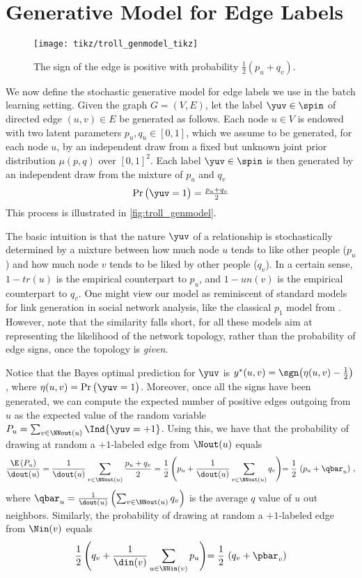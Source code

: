 \section{Generative Model for Edge Labels}\label{s:gen}

\begin{wrapfigure}[8]{o}[10mm]{50mm}
	\centering
	\texttt{[image: tikz/troll\_genmodel\_tikz]}
	\caption{\small The sign \yuv{} of the edge \euv{} is positive with probability $\frac{1}{2}(p_u+q_v)$.
	\label{fig:troll_genmodel}}
\end{wrapfigure}
We now define the stochastic generative model for edge labels we use in the batch learning setting.
Given the graph $G = (V,E)$, let the label $\yuv \in \spin$ of directed edge $(u,v) \in E$ be
generated as follows. Each node $u \in V$ is endowed with two latent parameters $p_u, q_u \in
[0,1]$, which we assume to be generated, for each node $u$, by an independent draw from a fixed but
unknown joint prior distribution $\mu(p,q)$ over $[0,1]^2$. Each label $\yuv \in \spin$ is then
generated by an independent draw from the mixture of $p_u$ and $q_v$
$$\Pr\big( \yuv = 1 \big) = \tfrac{p_u + q_v}{2}$$
This process is illustrated in \autoref{fig:troll_genmodel}.

The basic intuition is that the nature $\yuv$ of a relationship \euv{} is stochastically
determined by a mixture between how much node $u$ tends to like other people ($p_u$) and how much
node $v$ tends to be liked by other people ($q_v$). In a certain sense, $1-tr(u)$ is the empirical
counterpart to $p_u$, and $1-un(v)$ is the empirical counterpart to $q_v$. One might view
our model as reminiscent of standard models for link generation in social network analysis, like the
classical $p_1$ model from \cite{hl81}. However, note that the similarity falls short, for all these
models aim at
representing the likelihood of the network topology, rather than the probability of edge signs, once
the topology is \emph{given}.

Notice that the Bayes optimal prediction for $\yuv$ is $y^*(u,v) = \sgn\big(\eta(u,v) -
\tfrac{1}{2}\big)$, where $\eta(u,v) = \Pr\big( \yuv = 1 \big)$. Moreover, once all the signs have
been generated, we can compute the expected number of positive edges outgoing from $u$ as the
expected value of the random variable $P_u = \sum_{v\in \NNout(u)} \Ind{\yuv = +1}$. Using this, we
have that the probability of
drawing at random a $+1$-labeled edge from $\Nout(u)$ equals
\begin{equation}\label{e:pout}
	\frac{\E\left(P_u\right)}{\dout(u)} =
	\frac{1}{\dout(u)} \sum_{v\in \NNout(u)} \frac{p_u + q_v}{2} =
	\frac{1}{2}\,\Biggl(p_u + \frac{1}{\dout(u)} \sum_{v\in \NNout(u)} q_v \Biggl) =
		\frac{1}{2}\,\left(p_u + \qbar_u\right)\,,
\end{equation}
where $\qbar_u = \frac{1}{\dout(u)} \left( \sum_{v\in \NNout(u)} q_v \right)$ is the average $q$
value of $u$ out neighbors.
Similarly, the probability of drawing at random a $+1$-labeled edge from $\Nin(v)$ equals
\begin{equation}\label{e:pin}
	\frac{1}{2}\,\Biggl(q_v + \frac{1}{\din(v)} \sum_{u\in \NNin(v)} p_u \Biggl)=
		\frac{1}{2}\,\left(q_v + \pbar_v\right)
\end{equation}
